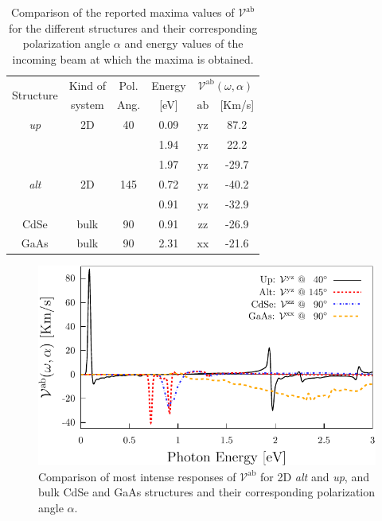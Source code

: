 \documentclass[prb,11pt,tightenlines,twocolumn,aps]{revtex4-1}
\begin{document}
\begin{table}[b]
\begin{tabular}{cccccc}
\hline
\multirow{2}{*}{Structure \quad} & 
Kind of \quad & 
Pol. &
Energy & 
\multicolumn{2}{c}{$\mathcal{V}^{\mathrm{ab}}(\omega,\alpha)$}\\
\cline{5-6}
& system & Ang. & [eV] & $\mathrm{ab}$ \quad & [Km/s]\\
\hline
\emph{up}    & 2D   & 40    & 0.09  & $\mathrm{yz}$ &  87.2    \\
             &      &       & 1.94  & $\mathrm{yz}$ &  22.2    \\
             &      &       & 1.97  & $\mathrm{yz}$ & -29.7    \\
\emph{alt}   & 2D   & 145   & 0.72  & $\mathrm{yz}$ & -40.2    \\
             &      &       & 0.91  & $\mathrm{yz}$ & -32.9    \\
 CdSe        & bulk & 90    & 0.91  & $\mathrm{zz}$ & -26.9    \\
 GaAs        & bulk & 90    & 2.31  & $\mathrm{xx}$ & -21.6    \\
\hline
\end{tabular}

\caption{Comparison of the reported maxima values of
$\mathcal{V}^{\mathrm{ab}}$ for the different structures and their
corresponding polarization angle $\alpha$ and energy values of the incoming
beam at which the maxima is obtained.}
\label{tab:vab-str-comp}
\end{table}

\begin{figure}[t]
    \centering
    \includegraphics[width=\linewidth]{plots/vab-str-comp}
    
    \caption{Comparison of most intense responses of
    $\mathcal{V}^{\mathrm{ab}}$ for 2D \emph{alt} and \emph{up}, and bulk CdSe
    and GaAs structures and their corresponding polarization angle $\alpha$.}
    \label{fig:vab-str-comp}
\end{figure}
\end{document}
